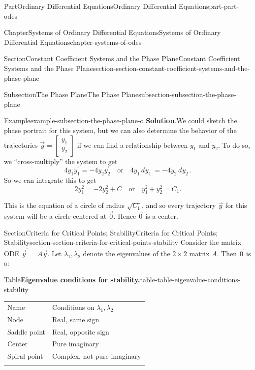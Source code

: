 \documentclass[twoside,10pt,]{book}
\newcommand{\blocktitlefont}{\relax}
\newcommand{\tabularfont}{\relax}
\numberwithin{equation}{part}
\newcommand{\hrulethick} {\noalign{\hrule height 0.11em}}
\newcommand{\dd}[2][]{\, d^{#1} #2\ }
\newcommand{\qq}[1]{\quad\text{#1}\quad}
\begin{document}
\begin{partptx}{Part}{Ordinary Differential Equations}{}{Ordinary Differential Equations}{}{}{part-part-odes}
\begin{chapterptx}{Chapter}{Systems of Ordinary Differential Equations}{}{Systems of Ordinary Differential Equations}{}{}{chapter-systems-of-odes}
\begin{sectionptx}{Section}{Constant Coefficient Systems and the Phase Plane}{}{Constant Coefficient Systems and the Phase Plane}{}{}{section-section-constant-coefficient-systems-and-the-phase-plane}
\begin{subsectionptx}{Subsection}{The Phase Plane}{}{The Phase Plane}{}{}{subsection-subsection-the-phase-plane}
\begin{example}{Example}{}{example-subsection-the-phase-plane-o}
\noindent\textbf{\blocktitlefont Solution}.\hypertarget{solution-subsection-the-phase-plane-o-b}{}\quad{}We could sketch the phase portrait for this system, but we can also determine the behavior of the trajectories \(\vec{y} = \begin{bmatrix} y_{1} \\ y_{2} \end{bmatrix} \) if we can find a relationship between \(y_{1}\) and \(y_{2}\). To do so, we ``cross-multiply'' the system to get%
\begin{equation*}
4y_{1}y^\prime_{1} = -4y_{2}y^\prime_{2} \quad\text{or}\quad 4y_{1}\dd{y_{1}} = -4y_{2}\dd{y_{2}}.
\end{equation*}
So we can integrate this to get%
\begin{equation*}
2y_{1}^{2} = -2y_{2}^{2}+C\qq{or}y_{1}^{2}+y_{2}^{2} = C_{1}.
\end{equation*}
%
\par
This is the equation of a circle of radius \(\sqrt{C_{1}}\), and so every trajectory \(\vec{y}\) for this system will be a circle centered at \(\vec{0}\). Hence \(\vec{0}\) is a center.%
\end{example}
\end{subsectionptx}
\end{sectionptx}
%
%
\typeout{************************************************}
\typeout{************************************************}
%
\begin{sectionptx}{Section}{Criteria for Critical Points; Stability}{}{Criteria for Critical Points; Stability}{}{}{section-section-criteria-for-critical-points-stability}
Consider the matrix ODE \(\vec{y}^\prime = A\vec{y}\). Let \(\lambda_{1},\lambda_{2}\) denote the eigenvalues of the \(2\times 2\) matrix \(A\). Then \(\vec{0}\) is a:%
\begin{tableptx}{Table}{\textbf{Eigenvalue conditions for stability.}}{table-table-eigenvalue-conditions-stability}{}%
\centering%
{\tabularfont%
\begin{tabular}{ll}\hrulethick
Name&Conditions on \(\lambda_{1},\lambda_{2}\)\tabularnewline\hrulethick
Node&Real, same sign\tabularnewline[0pt]
Saddle point&Real, opposite sign\tabularnewline[0pt]
Center&Pure imaginary\tabularnewline[0pt]
Spiral point&Complex, not pure imaginary\tabularnewline\hrulethick
\end{tabular}
}%
\end{tableptx}%

\end{sectionptx}
\end{chapterptx}
\end{partptx}
\end{document}
